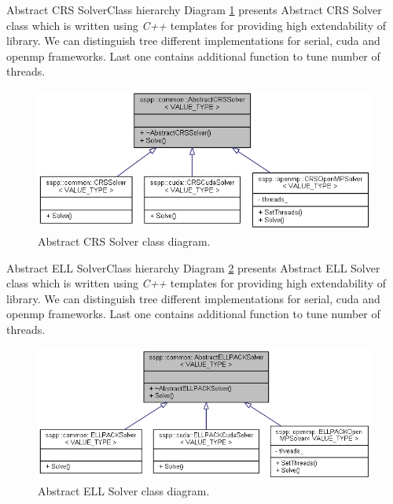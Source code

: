 		\begin{design-element}{Abstract \glsdesc{CRS} Solver}{Class hierarchy}
			Diagram \ref{fig:crs-solver} presents Abstract \gls{CRS} Solver class which is written using \emph{C++} templates for providing high extendability of library. We can distinguish tree different implementations for serial, \gls{cuda} and \gls{openmp} frameworks. Last one contains additional function to tune number of threads. 
			\begin{figure}[!hp]
				\centering
				\includegraphics[scale=0.6]{others/img/abstract-crs-solver}
				\caption{Abstract \glsdesc{CRS} Solver class diagram.}
				\label{fig:crs-solver}
			\end{figure}
		\end{design-element}
		\clearpage
		\begin{design-element}{Abstract \glsdesc{ELL} Solver}{Class hierarchy}
				Diagram \ref{fig:ell-solver} presents Abstract \gls{ELL} Solver class which is written using \emph{C++} templates for providing high extendability of library. We can distinguish tree different implementations for serial, \gls{cuda} and \gls{openmp} frameworks. Last one contains additional function to tune number of threads. 
			\begin{figure}[!hp]
				\centering
				\includegraphics[scale=0.6]{others/img/abstract-elpack-solver}
				\caption{Abstract \glsdesc{ELL} Solver class diagram.}
				\label{fig:ell-solver}
			\end{figure}
		\end{design-element}
	
